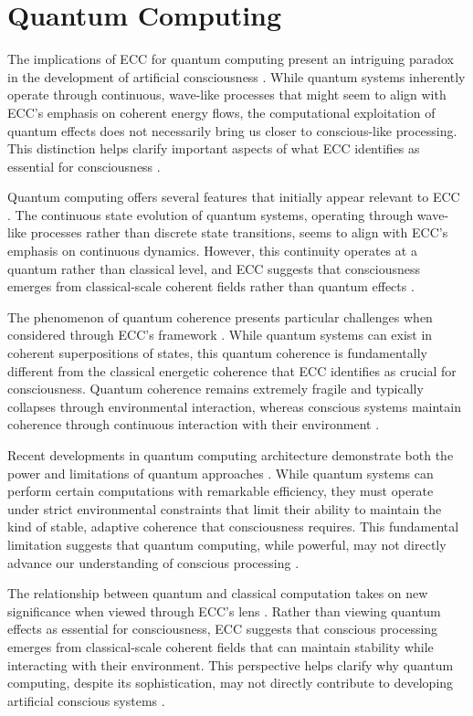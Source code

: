 \section{Quantum Computing}

The implications of ECC for quantum computing present an intriguing paradox in the development of artificial consciousness \cite{Aaronson2021a}. While quantum systems inherently operate through continuous, wave-like processes that might seem to align with ECC's emphasis on coherent energy flows, the computational exploitation of quantum effects does not necessarily bring us closer to conscious-like processing. This distinction helps clarify important aspects of what ECC identifies as essential for consciousness \cite{Arute2019}.

Quantum computing offers several features that initially appear relevant to ECC \cite{Bernstein2018}. The continuous state evolution of quantum systems, operating through wave-like processes rather than discrete state transitions, seems to align with ECC's emphasis on continuous dynamics. However, this continuity operates at a quantum rather than classical level, and ECC suggests that consciousness emerges from classical-scale coherent fields rather than quantum effects \cite{Deutsch2020}.

The phenomenon of quantum coherence presents particular challenges when considered through ECC's framework \cite{DiVincenzo2019}. While quantum systems can exist in coherent superpositions of states, this quantum coherence is fundamentally different from the classical energetic coherence that ECC identifies as crucial for consciousness. Quantum coherence remains extremely fragile and typically collapses through environmental interaction, whereas conscious systems maintain coherence through continuous interaction with their environment \cite{Harrow2020}.

Recent developments in quantum computing architecture demonstrate both the power and limitations of quantum approaches \cite{Kitaev2018}. While quantum systems can perform certain computations with remarkable efficiency, they must operate under strict environmental constraints that limit their ability to maintain the kind of stable, adaptive coherence that consciousness requires. This fundamental limitation suggests that quantum computing, while powerful, may not directly advance our understanding of conscious processing \cite{Montanaro2021}.

The relationship between quantum and classical computation takes on new significance when viewed through ECC's lens \cite{Nielsen2020}. Rather than viewing quantum effects as essential for consciousness, ECC suggests that conscious processing emerges from classical-scale coherent fields that can maintain stability while interacting with their environment. This perspective helps clarify why quantum computing, despite its sophistication, may not directly contribute to developing artificial conscious systems \cite{Preskill2019}.

